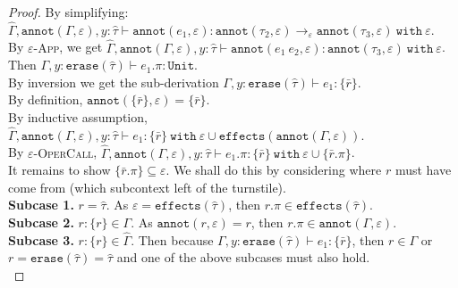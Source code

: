 \documentclass{llncs}
\newcommand{\keywadj}[1]{\mathtt{#1}}
\newcommand{\keyw}[1]{\keywadj{#1}~}
\newcommand{\kw}[1]{\keyw{ #1 }}
\newcommand{\kwa}[1]{\keywadj{ #1 }}
\newcommand{\Unit}[0]{ \kwa{Unit} }
\begin{document}
\begin{proof}
\noindent
By simplifying: $\hat \Gamma, \kwa{annot}(\Gamma, \varepsilon), y: \hat \tau \vdash \kwa{annot}(e_1, \varepsilon): \kwa{annot}(\tau_2, \varepsilon) \rightarrow_{\varepsilon} \kwa{annot}(\tau_3, \varepsilon)~\kw{with} \varepsilon$. \\

\noindent
By \textsc{$\varepsilon$-App}, we get $\hat \Gamma, \kwa{annot}(\Gamma, \varepsilon), y: \hat \tau \vdash \kwa{annot}(e_1~e_2, \varepsilon):  \kwa{annot}(\tau_3, \varepsilon)~\kw{with} \varepsilon$.
\\

\noindent
{} Then $\Gamma, y: \kwa{erase}(\hat \tau) \vdash e_1.\pi : \Unit$. \\

\noindent
By inversion we get the sub-derivation $\Gamma, y: \kwa{erase}(\hat \tau) \vdash e_1: \{ \bar r \}$. \\

\noindent
By definition, $\kwa{annot}(\{ \bar r \}, \varepsilon) = \{ \bar r \}$. \\

\noindent
By inductive assumption, $\hat \Gamma, \kwa{annot}(\Gamma, \varepsilon), y: \hat \tau \vdash e_1: \{ \bar r \} ~\kw{with} \varepsilon \cup \kwa{effects}(\kwa{annot}(\Gamma, \varepsilon))$. \\

\noindent
By \textsc{$\varepsilon$-OperCall}, $\hat \Gamma, \kwa{annot}(\Gamma, \varepsilon), y: \hat \tau \vdash e_1.\pi: \{ \bar r \} ~\kw{with} \varepsilon \cup \{ \bar r.\pi \}$. \\

\noindent
It remains to show $\{ \bar r.\pi \} \subseteq \varepsilon$. We shall do this by considering where $r$ must have come from (which subcontext left of the turnstile). \\

\noindent
\textbf{Subcase 1.} $r = \hat \tau$. As $\varepsilon = \kwa{effects}(\hat \tau)$, then $r.\pi \in \kwa{effects}(\hat \tau)$. \\

\noindent
\textbf{Subcase 2.} $r: \{ r \} \in \Gamma$. As $\kwa{annot}(r, \varepsilon) = r$, then $r.\pi \in \kwa{annot}(\Gamma, \varepsilon)$. \\

\noindent
\textbf{Subcase 3.} $r: \{ r \} \in \hat \Gamma$. Then because $\Gamma, y: \kwa{erase}(\hat \tau) \vdash e_1: \{ \bar r \}$, then $r \in \Gamma$ or $r = \kwa{erase}(\hat \tau) = \hat \tau$ and one of the above subcases must also hold. \\


\end{proof}
\end{document}
